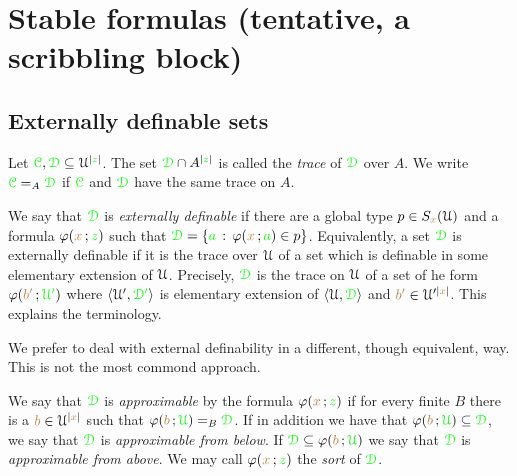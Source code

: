 \documentclass[creche.tex]{subfiles}
\begin{document}
\chapter{Stable formulas (tentative, a scribbling block)}
\label{stability}

\def\mrA{{\mr\Aa}}
\def\grB{{\gr\B}}
\def\grC{{\gr\C}}
\def\grD{{\gr\D}}

\def\medrel#1{\parbox[t]{6ex}{$\displaystyle\hfil #1$}}
\def\ceq#1#2#3{\parbox{25ex}{$\displaystyle #1$}\medrel{#2}$\displaystyle  #3$}

\section{Externally definable sets}
\label{external}


Let $\grC,\grD\subseteq\U^{|{\gr z}|}$. The set $\grD\cap A^{|{\gr z}|}$ is called the \emph{trace\/} of $\grD$ over $A$. We write $\grC=_A\grD$ if  $\grC$ and $\grD$ have the same trace on $A$.

We say that $\grD$ is \emph{externally definable\/} if there are a global type $p\in S_{\color{brown} x}(\EuScript U)$ and a formula $\varphi({\color{brown} x}\,;{\color{green} z})$ such that $\grD=\{{\gr a}\,:\,\phi({\mr x}\,;{\gr a})\in p\}$. Equivalently, a set $\grD$ is externally definable if it is the trace over $\EuScript U$ of a set which is definable in some elementary extension of $\EuScript U$. Precisely, $\grD$ is the trace on $\EuScript U$ of a set of he form $\varphi({\color{brown} b'}\,;{\color{green}\EuScript U'})$ where $\langle\EuScript U',{\color{green}\EuScript D'}\rangle$ is elementary extension of $\<\U,\grD\>$ and ${\color{brown} b'}\in\EuScript U'^{|{\color{brown} x}|}$. This explains the terminology.

\noindent\llap{\textcolor{red}{\Large\danger}\kern1.5ex}We prefer to deal with external definability in a different, though equivalent, way. This is not the most commond approach.

\begin{definition}\label{def_epprox}
We say that $\grD$ is \emph{approximable\/} by the formula $\varphi({\color{brown} x}\,;{\color{green} z})$ if for every finite $B$ there is a ${\color{brown} b}\in\EuScript U^{|{\color{brown} x}|}$ such that $\phi({\mr b}\,;{\gr\U})=_B\grD$. If in addition we have that $\phi({\mr b}\,;{\gr\U})\subseteq\grD$, we say that  $\grD$ is \emph{approximable from below}. If  $\grD\subseteq\phi({\mr b}\,;{\gr\U})$ we say that  $\grD$ is \emph{approximable from above}. We may call $\varphi({\color{brown} x}\,;{\color{green} z})$ the \emph{sort} of $\grD$.\QED
\end{definition} 
 
\end{document}
